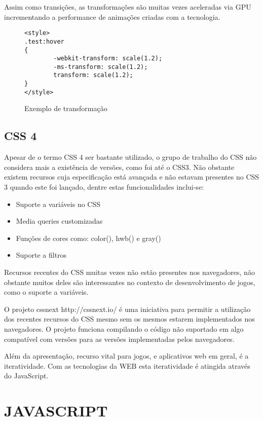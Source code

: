 Assim como transições, as transformações são muitas vezes aceleradas
via GPU incrementando a performance de animações criadas com a tecnologia.

\begin{figure}
\centering
\begin{verbatim}
<style>
.test:hover
{
        -webkit-transform: scale(1.2);
        -ms-transform: scale(1.2);
        transform: scale(1.2);
}
</style>
\end{verbatim}
\caption{Exemplo de transformação}
\label{fig:CSSTransform}
\end{figure}

\subsection{CSS 4}

Apesar de o termo CSS 4 ser bastante utilizado, o grupo de trabalho do CSS
não considera mais a existência de versões, como foi até o CSS3.
Não obstante existem recursos cuja especificação está avançada e não estavam presentes
no CSS 3 quando este foi lançado, dentre estas funcionalidades inclui-se:

\begin{itemize}
\item Suporte a variáveis no CSS
\item Media queries customizadas
\item Funções de cores como: color(), hwb() e gray()
\item Suporte a filtros
\end{itemize}

Recursos recentes do CSS muitas vezes não estão presentes nos
navegadores, não obstante muitos deles são interessantes no contexto
de desenvolvimento de jogos, como o suporte a variáveis.

O projeto cssnext http://cssnext.io/ é uma iniciativa para permitir a
utilização dos recentes recursos do CSS mesmo sem os mesmos estarem
implementados nos navegadores. O projeto funciona compilando o código
não suportado em algo compatível com versões para as versões
implementadas pelos navegadores.

Além da apresentação, recurso vital para jogos, e aplicativos web em
geral, é a iteratividade. Com as tecnologias da WEB esta iteratividade
é atingida através do JavaScript.
\section{JAVASCRIPT}

